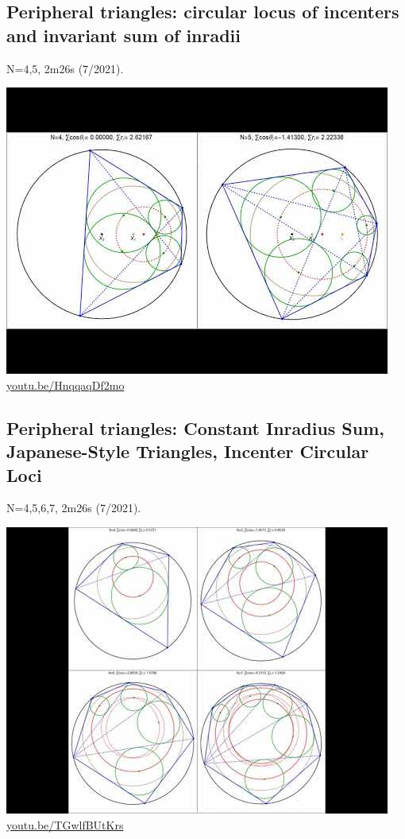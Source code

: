 \documentclass[12pt]{amsart}
\begin{document}
\subsection{Peripheral triangles: circular locus of incenters and invariant sum of inradii}
\label{vid:HnqqaqDf2mo}
\noindent N=4,5, 2m26s (7/2021). 
\begin{center}\includegraphics[width=.5\textwidth]{pics/HnqqaqDf2mo.jpg} \\ 
\href{https://youtu.be/HnqqaqDf2mo}{\url{youtu.be/HnqqaqDf2mo}}\end{center}
% 

\subsection{Peripheral triangles: Constant Inradius Sum, Japanese-Style Triangles, Incenter Circular Loci}
\label{vid:TGwlfBUtKrs}
\noindent N=4,5,6,7, 2m26s (7/2021). 
\begin{center}\includegraphics[width=.5\textwidth]{pics/TGwlfBUtKrs.jpg} \\ 
\href{https://youtu.be/TGwlfBUtKrs}{\url{youtu.be/TGwlfBUtKrs}}\end{center}
% 
\end{document}
